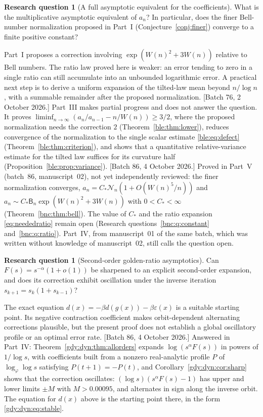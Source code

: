 \documentclass[11pt]{article}
\numberwithin{equation}{section}
\theoremstyle{definition}
\newtheorem{question}[theorem]{Research question}
\theoremstyle{remark}
\newcommand{\eps}{\varepsilon}
\begin{document}
\begin{question}[A full asymptotic equivalent for the coefficients]
What is the multiplicative asymptotic equivalent of $a_n$? In particular,
does the finer Bell-number normalization proposed in Part~I
(Conjecture~\ref{conj:finer}) converge to a finite positive constant?
\end{question}
Part~I proposes a correction involving
$\exp(W(n)^2+3W(n))$ relative to Bell numbers. The ratio law proved here
is weaker: an error tending to zero in a single ratio can still accumulate
into an unbounded logarithmic error. A practical next step is to derive a
uniform expansion of the tilted-law mean beyond $n/\log n$, with a
summable remainder after the proposed normalization.
[Batch 76, 2 October 2026.] Part~III makes partial progress and does not
answer the question. It proves
$\liminf_{n\to\infty}(a_n/a_{n-1}-n/W(n))\ge3/2$, where the proposed
normalization needs the correction $2$ (Theorem~\ref{ble:thm:lower}),
reduces convergence of the normalization to the single scalar estimate
\eqref{ble:eq:defect} (Theorem~\ref{ble:thm:criterion}), and shows that a
quantitative relative-variance estimate for the tilted law suffices for
its curvature half (Proposition~\ref{ble:prop:variance}).
[Batch 86, 4 October 2026.] Proved in Part~V (batch~86, manuscript~02), not yet
independently reviewed: the finer normalization converges,
$a_n=C_*\mathcal N_n(1+O(W(n)^5/n))$ and
$a_n\sim C_*\mathsf B_n\exp(W(n)^2+3W(n))$ with $0<C_*<\infty$
(Theorem~\ref{bnc:thm:bell}). The value of $C_*$ and the ratio expansion
\eqref{eq:neededratio} remain open (Research questions~\ref{bnc:q:constant}
and~\ref{bnc:q:ratio}). Part~IV, from manuscript~01 of the same batch,
which was written without knowledge of manuscript~02, still calls the
question open.

\begin{question}[Second-order golden-ratio asymptotics]
Can $F(s)=s^{-\alpha}(1+o(1))$ be sharpened to an explicit second-order
expansion, and does its correction exhibit oscillation under the inverse
iteration $s_{k+1}=s_k(1+s_{k-1})$?
\end{question}
The exact equation
$d(x)=-\beta d(g(x))-\beta\eps(x)$ is a suitable starting point.
Its negative contraction coefficient makes orbit-dependent alternating
corrections plausible, but the present proof does not establish a global
oscillatory profile or an optimal error rate.
[Batch 86, 4 October 2026.] Answered in Part~IV: Theorem~\ref{gdy:dyn:thm:allorders}
expands $\log(s^\alpha F(s))$ in powers of $1/\log s$, with coefficients
built from a nonzero real-analytic profile $P$ of $\log_\varphi\log s$
satisfying $P(t+1)=-P(t)$, and Corollary~\ref{gdy:dyn:cor:sharp} shows
that the correction oscillates: $(\log s)(s^\alpha F(s)-1)$ has upper and
lower limits $\pm M$ with $M>0.00095$, and alternates in sign along the
inverse orbit. The equation for $d(x)$ above is the starting point there,
in the form \eqref{gdy:dyn:eq:stable}.
\end{document}
